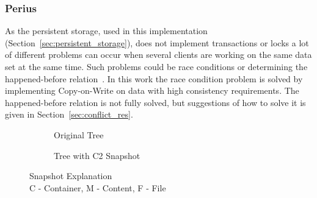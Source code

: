 \documentclass[a4paper,12pt]{article}
\begin{document}
\subsubsection{Perius}
As the persistent storage, used in this implementation (Section~\ref{sec:persistent_storage}), does
not implement transactions or locks a lot of different problems can occur when several clients are
working on the same data set at the same time. Such problems could be race conditions or determining
the happened-before relation~\cite{LAMPORT}. In this work the race condition problem is solved by 
implementing Copy-on-Write on data with high consistency requirements. The happened-before relation
is not fully solved, but suggestions of how to solve it is given in Section~\ref{sec:conflict_res}.

\begin{figure}[H] 
    \centering
    \begin{subfigure}{.3\textwidth}
        \centering
        \caption{Original Tree}
        \label{fig:orignal_tree}
    \end{subfigure}\qquad
    \begin{subfigure}{.4\textwidth}
        \centering
         \caption{Tree with C2 Snapshot}
         \label{fig:snapshot_tree}
    \end{subfigure}
    \caption{Snapshot Explanation\\ C - Container, M - Content, F - File}
    \label{fig:snapshot_expl}
\end{figure}
\end{document}
